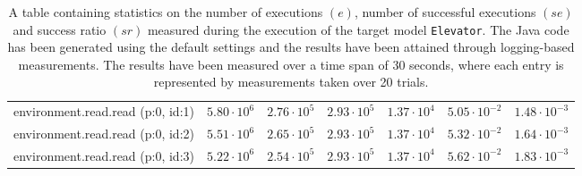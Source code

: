 \begin{table}[htbp]
{\begin{tabular}{lrrrrrr}
\hspace{3mm}environment.read.read (p:0, id:1) & $5.80 \cdot 10^{6}$ & $2.76 \cdot 10^{5}$ & $2.93 \cdot 10^{5}$ & $1.37 \cdot 10^{4}$ & $5.05 \cdot 10^{-2}$ & $1.48 \cdot 10^{-3}$ \\
\hspace{3mm}environment.read.read (p:0, id:2) & $5.51 \cdot 10^{6}$ & $2.65 \cdot 10^{5}$ & $2.93 \cdot 10^{5}$ & $1.37 \cdot 10^{4}$ & $5.32 \cdot 10^{-2}$ & $1.64 \cdot 10^{-3}$ \\
\hspace{3mm}environment.read.read (p:0, id:3) & $5.22 \cdot 10^{6}$ & $2.54 \cdot 10^{5}$ & $2.93 \cdot 10^{5}$ & $1.37 \cdot 10^{4}$ & $5.62 \cdot 10^{-2}$ & $1.83 \cdot 10^{-3}$ \\
\bottomrule
\end{tabular}
}
\caption{A table containing statistics on the number of executions $(e)$, number of successful executions $(se)$ and success ratio $(sr)$ measured during the execution of the target model \texttt{Elevator}. The Java code has been generated using the default settings and the results have been attained through logging-based measurements. The results have been measured over a time span of 30 seconds, where each entry is represented by measurements taken over 20 trials.}
\label{table:frequency_results_elevator_logging}
\end{table}